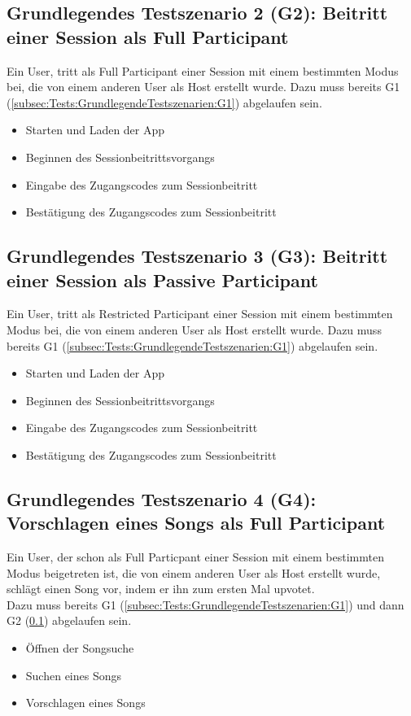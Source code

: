 \documentclass[oneside, ngerman]{sdqtechreport}
\begin{document}
\subsection{Grundlegendes Testszenario 2 (G2): Beitritt einer Session als Full Participant}
\label{subsec:Tests:GrundlegendeTestszenarien:G2}
Ein User, tritt als Full Participant einer Session mit einem bestimmten Modus bei, die von einem anderen User als Host erstellt wurde.
Dazu muss bereits G1 (\ref{subsec:Tests:GrundlegendeTestszenarien:G1}) abgelaufen sein.
\begin{itemize}
    \item Starten und Laden der App
    \item Beginnen des Sessionbeitrittsvorgangs
    \item Eingabe des Zugangscodes zum Sessionbeitritt
    \item Bestätigung des Zugangscodes zum Sessionbeitritt
\end{itemize}


\subsection{Grundlegendes Testszenario 3 (G3): Beitritt einer Session als Passive Participant}
\label{subsec:Tests:GrundlegendeTestszenarien:G3}
Ein User, tritt als Restricted Participant einer Session mit einem bestimmten Modus bei, die von einem anderen User als Host erstellt wurde.
Dazu muss bereits G1 (\ref{subsec:Tests:GrundlegendeTestszenarien:G1}) abgelaufen sein.
\begin{itemize}
    \item Starten und Laden der App
    \item Beginnen des Sessionbeitrittsvorgangs
    \item Eingabe des Zugangscodes zum Sessionbeitritt
    \item Bestätigung des Zugangscodes zum Sessionbeitritt
\end{itemize}

\subsection{Grundlegendes Testszenario 4 (G4): Vorschlagen eines Songs als Full Participant}
\label{subsec:Tests:GrundlegendeTestszenarien:G4}
Ein User, der schon als Full Particpant einer Session mit einem bestimmten Modus beigetreten ist, die von einem anderen User als Host erstellt wurde, schlägt einen Song vor, indem er ihn zum ersten Mal upvotet. \\
Dazu muss bereits G1 (\ref{subsec:Tests:GrundlegendeTestszenarien:G1}) und dann G2 (\ref{subsec:Tests:GrundlegendeTestszenarien:G2}) abgelaufen sein.
\begin{itemize}
    \item Öffnen der Songsuche
    \item Suchen eines Songs
    \item Vorschlagen eines Songs
\end{itemize}
\end{document}

